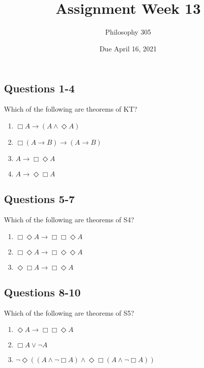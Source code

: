 \documentclass[
  11pt,
]{article}
\title{Assignment Week 13}
\author{Philosophy 305}
\date{Due April 16, 2021}
\providecommand{\tightlist}{%
  \setlength{\itemsep}{0pt}\setlength{\parskip}{0pt}}
\begin{document}
\maketitle

\hypertarget{questions-1-4}{%
\subsection{Questions 1-4}\label{questions-1-4}}

Which of the following are theorems of KT?

\begin{enumerate}
\def\labelenumi{\arabic{enumi}.}
\tightlist
\item
  \(\Box A \rightarrow (A \wedge \Diamond A)\)
\item
  \(\Box (A \rightarrow B) \rightarrow (A \rightarrow B)\)
\item
  \(A \rightarrow \Box \Diamond A\)
\item
  \(A \rightarrow \Diamond \Box A\)
\end{enumerate}

\hypertarget{questions-5-7}{%
\subsection{Questions 5-7}\label{questions-5-7}}

Which of the following are theorems of S4?

\begin{enumerate}
\def\labelenumi{\arabic{enumi}.}
\setcounter{enumi}{4}
\tightlist
\item
  \(\Box \Diamond A \rightarrow \Box \Box \Diamond A\)
\item
  \(\Box \Diamond A \rightarrow \Box \Diamond \Diamond A\)
\item
  \(\Diamond \Box A \rightarrow \Box \Diamond A\)
\end{enumerate}

\hypertarget{questions-8-10}{%
\subsection{Questions 8-10}\label{questions-8-10}}

Which of the following are theorems of S5?

\begin{enumerate}
\def\labelenumi{\arabic{enumi}.}
\setcounter{enumi}{7}
\tightlist
\item
  \(\Diamond A \rightarrow \Box \Box \Diamond A\)
\item
  \(\Box A \vee \neg A\)
\item
  \(\neg \Diamond ((A \wedge \neg \Box A) \wedge \Diamond \Box (A \wedge \neg \Box A))\)
\end{enumerate}
\end{document}
